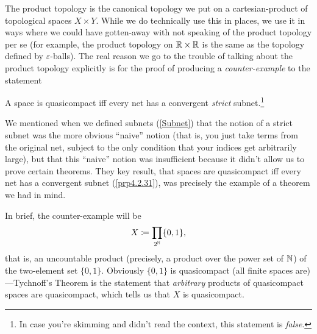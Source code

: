 The product topology is the canonical topology we put on a cartesian-product of topological spaces $X\times Y$.  While we do technically use this in places, we use it in ways where we could have gotten-away with not speaking of the product topology per se (for example, the product topology on $\mathbb{R} \times \mathbb{R}$ is the same as the topology defined by $\varepsilon$-balls).  The real reason we go to the trouble of talking about the product topology explicitly is for the proof of producing a \emph{counter-example} to the statement
\begin{footnoteequation}
\begin{textequation}
A space is quasicompact iff every net has a convergent \emph{strict} subnet.\footnote{In case you're skimming and didn't read the context, this statement is \emph{false}.}
\end{textequation}
\end{footnoteequation}
We mentioned when we defined subnets (\cref{Subnet}) that the notion of a strict subnet was the more obvious ``naive'' notion (that is, you just take terms from the original net, subject to the only condition that your indices get arbitrarily large), but that this ``naive'' notion was insufficient because it didn't allow us to prove certain theorems.  They key result, that spaces are quasicompact iff every net has a convergent subnet (\cref{prp4.2.31}), was precisely the example of a theorem we had in mind.

In brief, the counter-example will be
\begin{equation}
X\coloneqq \prod _{2^{\mathbb{N}}}\{ 0,1\} ,
\end{equation}
that is, an uncountable product (precisely, a product over the power set of $\mathbb{N}$) of the two-element set $\{ 0,1\}$.  Obviously $\{ 0,1\}$ is quasicompact (all finite spaces are)---Tychnoff's Theorem is the statement that \emph{arbitrary} products of quasicompact spaces are quasicompact, which tells us that $X$ is quasicompact.

